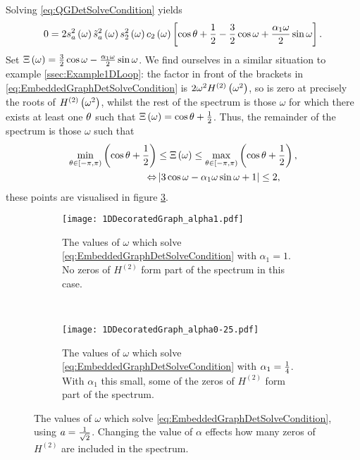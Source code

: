 Solving \eqref{eq:QGDetSolveCondition} yields
\begin{align} \label{eq:EmbeddedGraphDetSolveCondition}
	0 = 2s_a^2\left( \omega \right) \tilde{s}_a^2\left( \omega \right) s_2^2\left( \omega \right) c_2\left( \omega \right)
	\left[  \cos\theta + \frac{1}{2} - \frac{3}{2}\cos\omega + \frac{\alpha_1\omega}{2}\sin\omega  \right].
\end{align}
Set $\Xi\left( \omega \right) = \frac{3}{2}\cos\omega - \frac{\alpha_1\omega}{2}\sin\omega$.
We find ourselves in a similar situation to example \ref{ssec:Example1DLoop}: the factor in front of the brackets in \eqref{eq:EmbeddedGraphDetSolveCondition} is $2\omega^2 H^{(2)}\left( \omega^2 \right)$, so is zero at precisely the roots of $H^{(2)}\left( \omega^2 \right)$, whilst the rest of the spectrum is those $\omega$ for which there exists at least one $\theta$ such that $\Xi\left( \omega \right) = \cos\theta + \frac{1}{2}$.
Thus, the remainder of the spectrum is those $\omega$ such that
\begin{align*}
	\min_{\theta\in\left[-\pi,\pi\right)}\left( \cos\theta + \frac{1}{2} \right) &\leq \Xi\left( \omega \right) 
	\leq \max_{\theta\in\left[-\pi,\pi\right)} \left( \cos\theta + \frac{1}{2} \right), \\
	\Leftrightarrow & \left\lvert  3\cos\omega - \alpha_1\omega\sin\omega + 1  \right\rvert \leq 2, 
\end{align*}
these points are visualised in figure \ref{fig:1DDecoratedGraph}.
\begin{figure}[b!]
	\centering
	\begin{subfigure}[t]{0.45\textwidth}
		\centering
		\texttt{[image: 1DDecoratedGraph\_alpha1.pdf]}
		\caption{\label{fig:1DDecoratedGraph_alpha1} The values of $\omega$ which solve \eqref{eq:EmbeddedGraphDetSolveCondition} with $\alpha_1=1$. No zeros of $H^{(2)}$ form part of the spectrum in this case.}
	\end{subfigure}
	~
	\begin{subfigure}[t]{0.45\textwidth}
		\centering
		\texttt{[image: 1DDecoratedGraph\_alpha0-25.pdf]}
		\caption{\label{fig:1DDecoratedGraph_alpha0-25} The values of $\omega$ which solve \eqref{eq:EmbeddedGraphDetSolveCondition} with $\alpha_1=\frac{1}{4}$. With $\alpha_1$ this small, some of the zeros of $H^{(2)}$ form part of the spectrum.}
	\end{subfigure}
	\caption{\label{fig:1DDecoratedGraph} The values of $\omega$ which solve \eqref{eq:EmbeddedGraphDetSolveCondition}, using $a=\frac{1}{\sqrt{2}}$. Changing the value of $\alpha$ effects how many zeros of $H^{(2)}$ are included in the spectrum.}
\end{figure}
